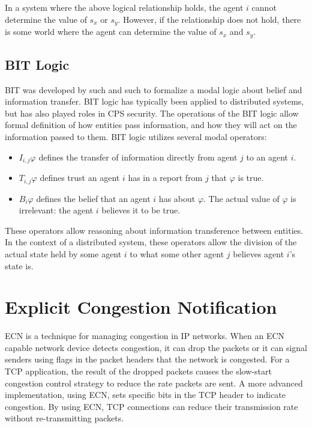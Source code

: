 In a system where the above logical relationship holds, the agent $i$ cannot determine the value of $s_x$ or $s_y$. However, if the relationship does not hold, there is some world where the agent can determine the value of $s_x$ and $s_y$.

\subsection{BIT Logic}

\ac{BIT} was developed by such and such to formalize a modal logic about belief and information transfer. \ac{BIT} logic has typically been applied to distributed systems, but has also played roles in \ac{CPS} security. The operations of the \ac{BIT} logic allow formal definition of how entities pass information, and how they will act on the information passed to them. \ac{BIT} logic utilizes several modal operators:

\begin{itemize}
\item $I_{i,j} \varphi$ defines the transfer of information directly from agent $j$ to an agent $i$. 
\item $T_{i,j} \varphi$ defines trust an agent $i$ has in a report from $j$ that $\varphi$ is true.
\item $B_i \varphi$ defines the belief that an agent $i$ has about $\varphi$. The actual value of $\varphi$ is irrelevant: the agent $i$ believes it to be true.
\end{itemize}

These operators allow reasoning about information transference between entities. In the context of a distributed system, these operators allow the division of the actual state held by some agent $i$ to what some other agent $j$ believes agent $i$'s state is.

\section{Explicit Congestion Notification}

\ac{ECN} is a technique for managing congestion in IP networks. 
When an \ac{ECN} capable network device detects congestion, it can drop the packets or it can signal senders using flags in the packet headers that the network is congested.
For a TCP application, the result of the dropped packets causes the slow-start congestion control strategy to reduce the rate packets are sent.
A more advanced implementation, using \ac{ECN}, sets specific bits in the TCP header to indicate congestion.
By using \ac{ECN}, TCP connections can reduce their transmission rate without re-transmitting packets.

